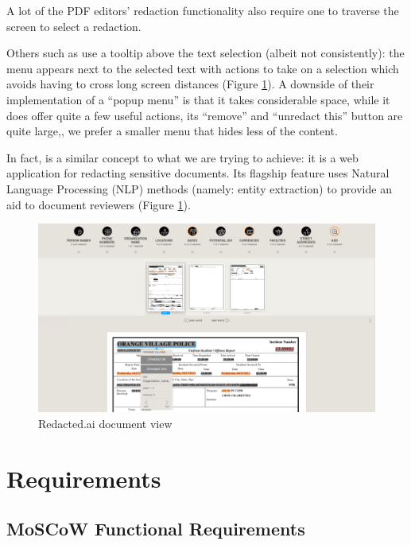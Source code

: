\documentclass{l4proj}
\begin{document}
A lot of the PDF editors' redaction functionality also require one to traverse the screen to select a redaction.

Others such as \textcite{RedactedAIRemovea} use a tooltip above the text selection (albeit not consistently): the menu appears next to the selected text with actions to take on a selection which avoids having to cross long screen distances (Figure \ref{fig:redactedai}).
A downside of their implementation of a ``popup menu'' is that it takes considerable space, while it does offer quite a few useful actions, its ``remove'' and ``unredact this'' button are quite large,, we prefer a smaller menu that hides less of the content.

In fact, \textcite{RedactedAIRemovea} is a similar concept to what we are trying to achieve: it is a web application for redacting sensitive documents. Its flagship feature uses Natural Language Processing (NLP) methods (namely: entity extraction) to provide an aid to document reviewers (Figure \ref{fig:redactedai}).

\begin{figure}[H]
    \centering
    \includegraphics[width=0.95\linewidth]{images/related_products/redactedai.png}
    \caption{Redacted.ai document view}
    \label{fig:redactedai}
\end{figure}

\chapter{Requirements}

\section{MoSCoW Functional Requirements}
\end{document}

